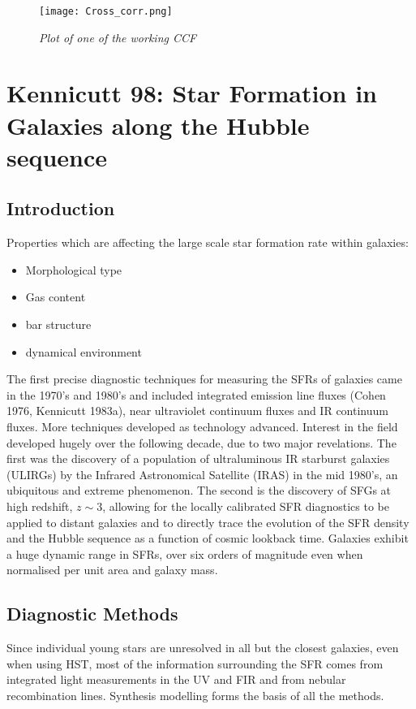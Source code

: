 \documentclass{literature}
\begin{document}
\begin{figure}[!htp]
\centering
\texttt{[image: Cross\_corr.png]}
\caption{\footnotesize{\emph{Plot of one of the working CCF}}}
\label{fig:cross_cor}
\end{figure}


\section{Kennicutt 98: Star Formation in Galaxies along the Hubble sequence}

\subsection{Introduction}
Properties which are affecting the large scale star formation rate within galaxies: 
\begin{itemize}
\item Morphological type 
\item Gas content 
\item bar structure 
\item dynamical environment
\end{itemize}

The first precise diagnostic techniques for measuring the SFRs of galaxies came in the 1970's and 1980's and included integrated emission line fluxes (Cohen 1976, Kennicutt 1983a), near ultraviolet continuum fluxes and IR continuum fluxes. More techniques developed as technology advanced. Interest in the field developed hugely over the following decade, due to two major revelations. The first was the discovery of a population of ultraluminous IR starburst galaxies (ULIRGs) by the Infrared Astronomical Satellite (IRAS) in the mid 1980's, an ubiquitous and extreme phenomenon. The second is the discovery of SFGs at high redshift, $z \sim 3$, allowing for the locally calibrated SFR diagnostics to be applied to distant galaxies and to directly trace the evolution of the SFR density and the Hubble sequence as a function of cosmic lookback time. Galaxies exhibit a huge dynamic range in SFRs, over six orders of magnitude even when normalised per unit area and galaxy mass.

\subsection{Diagnostic Methods}
Since individual young stars are unresolved in all but the closest galaxies, even when using HST, most of the information surrounding the SFR comes from integrated light measurements in the UV and FIR and from nebular recombination lines. Synthesis modelling forms the basis of all the methods. 
\end{document}
